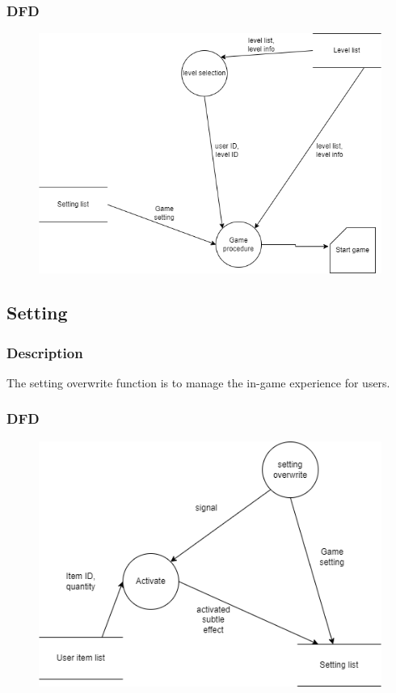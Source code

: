 \documentclass{article}
\begin{document}
\subsubsection{DFD}
\begin{figure}[H]
    \centering
    \includegraphics*[scale=0.4]{Game_procedure_DFD.png}
\end{figure}
\subsection{Setting}
\subsubsection{Description}
\par The setting overwrite function is to manage the in-game experience for users.
\subsubsection{DFD}
\begin{figure}[H]
    \centering
    \includegraphics*[scale=0.4]{Setting_DFD.png}
\end{figure}
\end{document}

